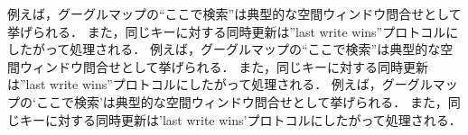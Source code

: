 例えば，グーグルマップの“ここで検索”は典型的な空間ウィンドウ問合せとして挙げられる．
また，同じキーに対する同時更新は”last write wins”プロトコルにしたがって処理される．
例えば，グーグルマップの“ここで検索”は典型的な空間ウィンドウ問合せとして挙げられる．
また，同じキーに対する同時更新は”last write wins”プロトコルにしたがって処理される．
例えば，グーグルマップの‘ここで検索’は典型的な空間ウィンドウ問合せとして挙げられる．
また，同じキーに対する同時更新は'last write wins'プロトコルにしたがって処理される．
